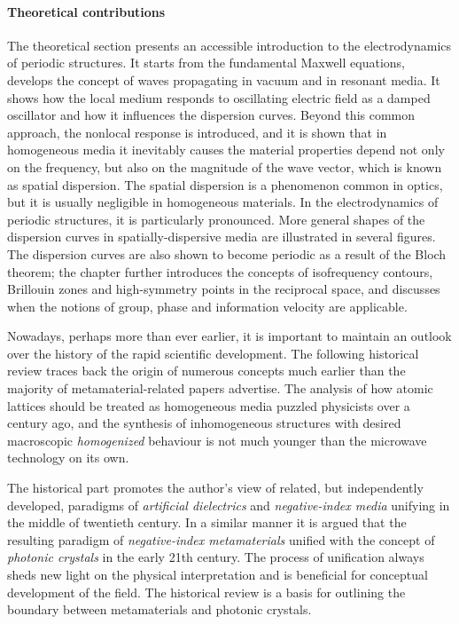 \paragraph{Theoretical contributions}
The theoretical section presents an accessible introduction to the electrodynamics of periodic structures. It starts from the fundamental Maxwell equations, develops the concept of waves propagating in vacuum and in resonant media. It shows how the local medium responds to oscillating electric field as a damped oscillator and how it influences the dispersion curves. Beyond this common approach, the nonlocal response is introduced, and it is shown that in homogeneous media it inevitably causes the material properties depend not only on the frequency, but also on the magnitude of the wave vector, which is known as spatial dispersion. 
The spatial dispersion is a phenomenon common in optics, but it is usually negligible in homogeneous materials. In the electrodynamics of periodic structures,  it is particularly pronounced. More general shapes of the dispersion curves in spatially-dispersive media are illustrated in several figures. 
The dispersion curves are also shown to become periodic as a result of the Bloch theorem; the chapter further introduces the concepts of isofrequency contours, Brillouin zones and high-symmetry points in the reciprocal space, and discusses when the notions of group, phase and information velocity are applicable.

Nowadays, perhaps more than ever earlier, it is important to maintain an outlook over the history of the rapid scientific development. The following historical review traces back the origin of numerous concepts much earlier than the majority of metamaterial-related papers advertise. The analysis of how atomic lattices should be treated as homogeneous media puzzled physicists over a century ago, and the synthesis of inhomogeneous structures with desired macroscopic \textit{homogenized} behaviour is not much younger than the microwave technology on its own.

The historical part promotes the author's view of related, but independently developed, paradigms of \textit{artificial dielectrics} and \textit{negative-index media} unifying in the middle of twentieth century. In a similar manner it is argued that the resulting paradigm of \textit{negative-index metamaterials} unified with the concept of \textit{photonic crystals} in the early 21th century. The process of unification always sheds new light on the physical interpretation and is beneficial for conceptual development of the field. The historical review is a basis for outlining the boundary between metamaterials and photonic crystals.

